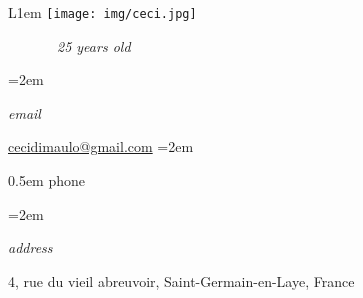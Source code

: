 \documentclass[10pt,a4paper]{scrartcl}
\newlength{\datebox}\settowidth{\datebox}{10.2018-1.2018} %
\newcommand{\NewEntryL}[3]{\noindent\hangindent=2em\hangafter=0 \parbox{\datebox}{\normalsize \textit{#1}}\hspace{5em} #2 #3 %
\vspace{0.5em}} %
\newcommand{\Description}[1]{\hangindent=2em\hangafter=0\raggedright\footnotesize{#1}\par\normalsize\vspace{1em}} %
\begin{document}
\thispagestyle{empty} %


\begin{wrapfigure}{L}{1em}
 \hspace*{-10em}
 \texttt{[image: img/ceci.jpg]}
\end{wrapfigure}

\begin{cv}{ \ \ \ \ \ \ \  \color{black}\large\emph{25 years old}}\vspace{2em} %


\NewEntryL{email}{\href{mailto:cecidimaulo@gmail.com}{cecidimaulo@gmail.com}} %

\NewEntryL{phone}{ +33 6 26 30 86 90} %

\NewEntryL{address}{ 4, rue du vieil abreuvoir, Saint-Germain-en-Laye, France} %

\vspace{1.2em} %




\vspace{1.5em} %


\end{cv}
\end{document}
